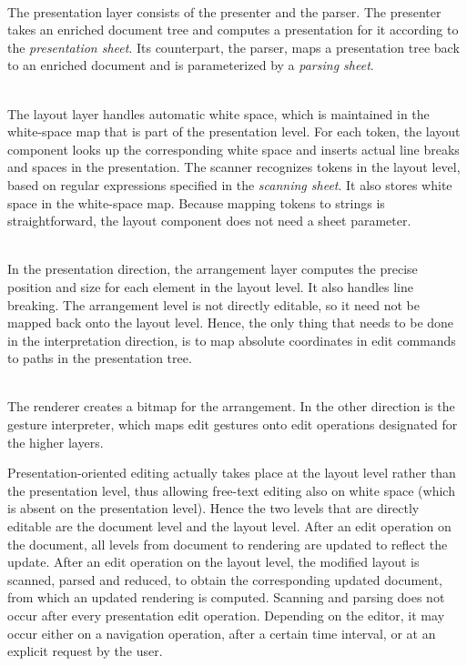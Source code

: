 \documentclass[10pt]{article}
\begin{document}
\\
The presentation layer consists of the presenter and the parser. The presenter takes an enriched document tree and computes a presentation for it according to the {\em presentation sheet}. Its counterpart, the parser, maps a presentation tree back to an enriched document and is parameterized by a {\em parsing sheet}.

\\
The layout layer handles automatic white space, which is maintained in the white-space map that is part of the presentation level. For each token, the layout component looks up the corresponding white space and inserts actual line breaks and spaces in the presentation. The scanner recognizes tokens in the layout level, based on regular expressions specified in the {\em scanning sheet}. It also stores white space in the white-space map. Because mapping tokens to strings is straightforward, the layout component does not need a sheet parameter.

\\
In the presentation direction, the arrangement layer computes the precise position and size for each element in the layout level. It also handles line breaking. The arrangement level is not directly editable, so it need not be mapped back onto the layout level. Hence, the only thing that needs to be done in the interpretation direction, is to map absolute coordinates in edit commands to paths in the presentation tree. 

\\
The renderer creates a bitmap for the arrangement. In the other direction is the gesture interpreter, which maps edit gestures onto edit operations designated for the higher layers.

\ec





Presentation-oriented editing actually takes place at the layout level rather than the presentation level, thus allowing free-text editing also on white space (which is absent on the presentation level). Hence the two levels that are directly editable are the document level and the layout level. After an edit operation on the document, all levels from document to rendering are updated to reflect the update. After an edit operation on the layout level, the modified layout is scanned, parsed and reduced, to obtain the corresponding updated document, from which an updated rendering is computed. Scanning and parsing does not occur after every presentation edit operation. Depending on the editor, it may occur either on a navigation operation, after a certain time interval, or at an explicit request by the user.
\end{document}
